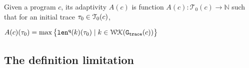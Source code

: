 \begin{defn}
    \label{def:trace_adapt}
    Given a program ${c}$, 
    its adaptivity $A(c)$ is function 
    $A(c) : \mathcal{T}_0(c)\to \mathbb{N}$ such that for an
    initial trace $\mathtt{\tau}_0 \in \mathcal{T}_0(c)$, 
\begin{center}
$
    A(c)(\mathtt{\tau}_0) = \max \big 
    \{ \mathtt{len}^{\tt q}(k)(\mathtt{\tau}_0) \mid k \in \mathcal{WK}(\mathtt{{G_{trace}}}(c)) \big \} 
$
\end{center}
\end{defn}

\subsection{The definition limitation}





